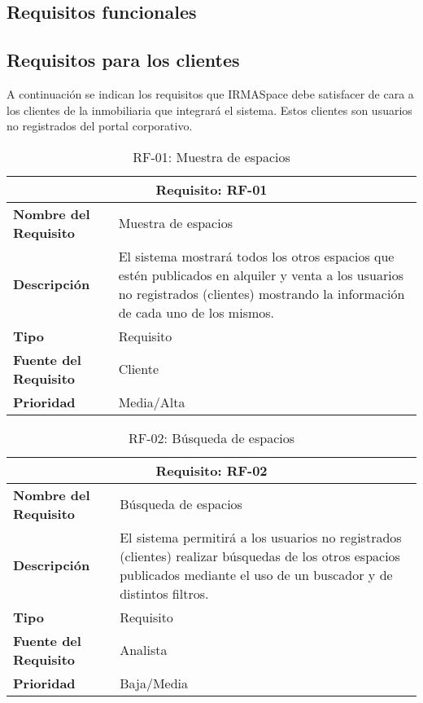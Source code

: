 \subsection{Requisitos funcionales}

\subsection{Requisitos para los clientes}

\par A continuación se indican los requisitos que IRMASpace debe satisfacer de cara a los clientes de la inmobiliaria que integrará el sistema. Estos clientes son usuarios no registrados del portal corporativo.

\begin{table}[H]
\begin{center}
\begin{tabular}{p{} p{7cm}}
\multicolumn{2}{c}{\textbf{Requisito: RF-01} } \\
\hline \hline
\textbf{Nombre del Requisito} &  Muestra de espacios \\
\hline
\textbf{Descripción} & El sistema mostrará todos los otros espacios que estén publicados en alquiler y venta a los usuarios no registrados (clientes) mostrando la información de cada uno de los mismos.\\
\hline
\textbf{Tipo} & Requisito  \\
\hline
\textbf{Fuente del Requisito} &  Cliente \\
\hline
\textbf{Prioridad} &  Media/Alta \\ \hline
\end{tabular}
\caption{RF-01: Muestra de espacios}
\label{tab:RF-01}
\end{center}
\end{table}

\begin{table}[H]
\begin{center}
\begin{tabular}{p{} p{7cm}}
\multicolumn{2}{c}{\textbf{Requisito: RF-02} } \\
\hline \hline
\textbf{Nombre del Requisito} &  Búsqueda de espacios \\
\hline
\textbf{Descripción} & El sistema permitirá a los usuarios no registrados (clientes) realizar búsquedas de los otros espacios publicados mediante el uso de un buscador y de distintos filtros. \\
\hline
\textbf{Tipo} & Requisito  \\
\hline
\textbf{Fuente del Requisito} &  Analista \\
\hline
\textbf{Prioridad} &  Baja/Media \\ \hline
\end{tabular}
\caption{RF-02: Búsqueda de espacios}
\label{tab:RF-02}
\end{center}
\end{table}

